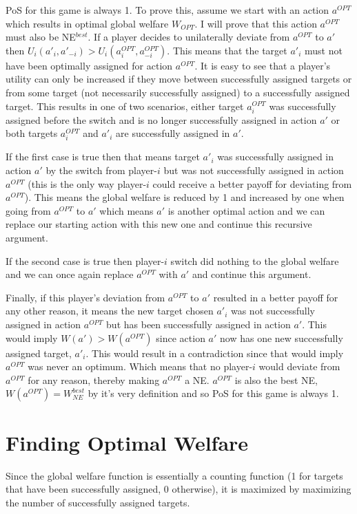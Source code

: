 \documentclass[defaultstyle,12pt]{proposal}
\begin{document}
PoS for this game is always 1. To prove this, assume we start with an action $a^{OPT}$ which results in optimal global welfare $W_{OPT}$. I will prove that this action $a^{OPT}$ must also be NE$^{best}$. If a player decides to unilaterally deviate from $a^{OPT}$ to $a'$ then $U_i(a'_i, a'_{-i}) > U_i(a^{OPT}_i, a^{OPT}_{-i})$. This means that the target $a'_i$ must not have been optimally assigned for action $a^{OPT}$. It is easy to see that a player's utility can only be increased if they move between successfully assigned targets or from some target (not necessarily successfully assigned) to a successfully assigned target. This results in one of two scenarios, either target $a^{OPT}_i$ was successfully assigned before the switch and is no longer successfully assigned in action $a'$ or both targets $a^{OPT}_i$ and $a'_i$ are successfully assigned in $a'$. 

If the first case is true then that means target $a'_i$ was successfully assigned in action $a'$ by the switch from player-$i$ but was not successfully assigned in action $a^{OPT}$ (this is the only way player-$i$ could receive a better payoff for deviating from $a^{OPT}$). This means the global welfare is reduced by 1 and increased by one when going from $a^{OPT}$ to $a'$ which means $a'$ is another optimal action and we can replace our starting action with this new one and continue this recursive argument.

If the second case is true then player-$i$ switch did nothing to the global welfare and we can once again replace $a^{OPT}$ with $a'$ and continue this argument.

Finally, if this player's deviation from $a^{OPT}$ to $a'$ resulted in a better payoff for any other reason, it means the new target chosen $a'_i$ was not successfully assigned in action $a^{OPT}$ but has been successfully assigned in action $a'$. This would imply $W(a') > W(a^{OPT})$ since action $a'$ now has one new successfully assigned target, $a'_i$. This would result in a contradiction since that would imply $a^{OPT}$ was never an optimum. Which means that no player-$i$ would deviate from $a^{OPT}$ for any reason, thereby making $a^{OPT}$ a NE. $a^{OPT}$ is also the best NE, $W(a^{OPT}) = W_{NE}^{best}$ by it's very definition and so PoS for this game is always 1.

\section{Finding Optimal Welfare}
Since the global welfare function is essentially a counting function (1 for targets that have been successfully assigned, 0 otherwise), it is maximized by maximizing the number of successfully assigned targets.
\end{document}
